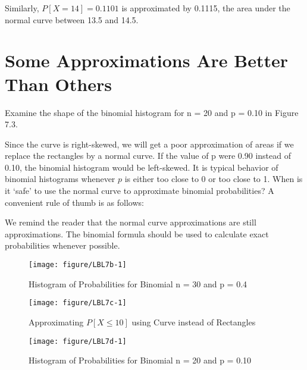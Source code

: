 \documentclass[11pt]{book}\usepackage[]{graphicx}\usepackage[]{color}
\begin{document}
Similarly, $P[X = 14] = 0.1101$ is approximated by 0.1115, the area under the normal curve between 13.5 and 14.5.

\section{Some Approximations Are Better Than Others}

Examine the shape of the binomial histogram for n = 20 and p = 0.10 in Figure 7.3.

Since the curve is right-skewed, we will get a poor approximation of areas if we replace the rectangles by a normal curve.  If the value of p were 0.90 instead of 0.10, the binomial histogram would be left-skewed.  It is typical behavior of binomial histograms whenever $p$ is either too close to 0 or too close to 1.  When is it `safe' to use the normal curve to approximate binomial probabilities?  A convenient rule of thumb is as follows:


We remind the reader that the normal curve approximations are still approximations.  The binomial formula should be used to calculate exact probabilities whenever possible.

\newpage

\begin{figure}[ht]

\caption{Histogram of Probabilities for Binomial n = 30 and p = 0.4}



{\centering \texttt{[image: figure/LBL7b-1]} 

}




 \end{figure}
 

\begin{figure}[ht]

\caption{Approximating $P[X \le 10]$ using Curve instead of Rectangles}



{\centering \texttt{[image: figure/LBL7c-1]} 

}




\end{figure}


 \begin{figure}[ht]

\caption{Histogram of Probabilities for Binomial n = 20 and p = 0.10}



{\centering \texttt{[image: figure/LBL7d-1]} 

}




\end{figure}
\end{document}
